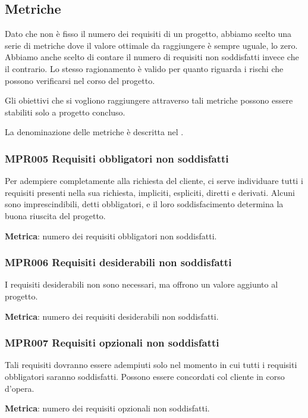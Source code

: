 	\subsection{Metriche}
	Dato che non è fisso il numero dei requisiti di un progetto, abbiamo scelto una serie di metriche dove il valore ottimale da raggiungere è sempre uguale, lo zero. Abbiamo anche scelto di contare il numero di requisiti non soddisfatti invece che il contrario. Lo stesso ragionamento è valido per quanto	riguarda i rischi che possono verificarsi nel corso del progetto.

	Gli obiettivi che si vogliono raggiungere attraverso tali metriche possono essere stabiliti solo a progetto concluso.

	La denominazione delle metriche è descritta nel \NdPd.

		\subsubsection{MPR005 Requisiti obbligatori non soddisfatti}
		Per adempiere completamente alla richiesta del cliente, ci serve individuare tutti i requisiti presenti nella sua richiesta, impliciti, espliciti, diretti e derivati. Alcuni sono imprescindibili, detti obbligatori, e il loro soddisfacimento determina la buona riuscita del progetto.

		\textbf{Metrica}: numero dei requisiti obbligatori non soddisfatti.

		\subsubsection{MPR006 Requisiti desiderabili non soddisfatti}
		I requisiti desiderabili non sono necessari, ma offrono un valore aggiunto al progetto.

		\textbf{Metrica}: numero dei requisiti desiderabili non soddisfatti.

		\subsubsection{MPR007 Requisiti opzionali non soddisfatti}
		Tali requisiti dovranno essere adempiuti solo nel momento in cui tutti i requisiti obbligatori saranno soddisfatti.
		Possono essere concordati col cliente in corso d'opera.

		\textbf{Metrica}: numero dei requisiti opzionali non soddisfatti.

